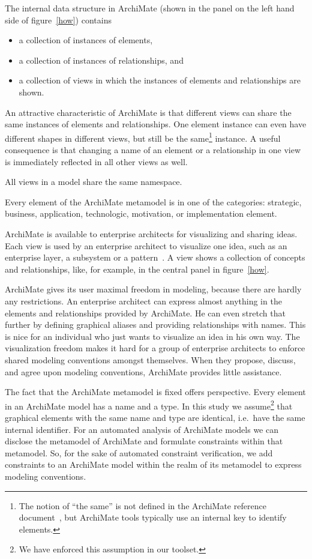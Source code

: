 \documentclass[sn-vancouver]{sn-jnl}%
\begin{document}
The internal data structure in ArchiMate (shown in the panel on the left hand side of figure~\ref{how}) contains
\begin{itemize}
  \item a collection of instances of elements,
  \item a collection of instances of relationships, and
  \item a collection of views in which the instances of elements and relationships are shown.
\end{itemize}
An attractive characteristic of ArchiMate is that different views can share the same instances of elements and relationships.
One element instance can even have different shapes in different views,
but still be the same\footnote{The notion of ``the same'' is not defined in the ArchiMate reference document~\cite{ArchiMate},
but ArchiMate tools typically use an internal key to identify elements.} instance.
A useful consequence is that changing a name of an element or a relationship in one view is immediately reflected in all other views as well.

All views in a model share the same namespace.

Every element of the ArchiMate metamodel is in one of the categories: strategic, business, application, technologic, motivation, or implementation element.

ArchiMate is available to enterprise architects for visualizing and sharing ideas.
Each view is used by an enterprise architect to visualize one idea, such as an enterprise layer, a subsystem or a pattern~\cite{lankhorst2010anatomy}.
A view shows a collection of concepts and relationships, like, for example, in the central panel in figure~\ref{how}.

ArchiMate gives its user maximal freedom in modeling, because there are hardly any restrictions.
An enterprise architect can express almost anything in the elements and relationships provided by ArchiMate.
He can even stretch that further by defining graphical aliases and providing relationships with names.
This is nice for an individual who just wants to visualize an idea in his own way.
The visualization freedom makes it hard for a group of enterprise architects to enforce shared modeling conventions amongst themselves.
When they propose, discuss, and agree upon modeling conventions,
ArchiMate provides little assistance.

The fact that the ArchiMate metamodel is fixed offers perspective.
Every element in an ArchiMate model has a name and a type.
In this study we assume\footnote{We have enforced this assumption in our toolset.} that graphical elements with the same name and type are identical, i.e.\ have the same internal identifier.
For an automated analysis of ArchiMate models we can disclose the metamodel of ArchiMate and formulate constraints within that metamodel.
So, for the sake of automated constraint verification, we add constraints to an ArchiMate model within the realm of its metamodel to express modeling conventions.
\end{document}

